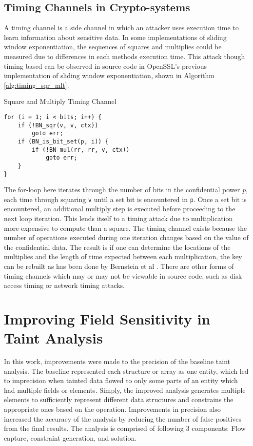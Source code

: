 \documentclass[11pt,a4paper]{article}
\begin{document}
\subsection{Timing Channels in Crypto-systems}

A timing channel is a side channel in which an attacker uses execution time to
learn information about sensitive data. In some implementations of sliding
window exponentiation, the sequences of squares and multiplies could be measured
due to differences in each methods execution time. This attack though timing
based can be observed in source code in OpenSSL's previous implementation of
sliding window exponentiation, shown in Algorithm \ref{alg:timing_sqr_mlt}. 

\begin{algorithm}
  \caption{Square and Multiply Timing Channel}
\begin{lstlisting}
for (i = 1; i < bits; i++) {
    if (!BN_sqr(v, v, ctx))
        goto err;
    if (BN_is_bit_set(p, i)) {
        if (!BN_mul(rr, rr, v, ctx))
            goto err;
    }
}
\end{lstlisting}
\label{alg:timing_sqr_mlt}
\end{algorithm}

The for-loop here iterates through the number of bits in the confidential power
\textit{p}, each time through squaring \texttt{v} until a set bit is encountered
in \texttt{p}. Once a set bit is encountered, an additional multiply step is
executed before proceeding to the next loop iteration. This lends itself to a
timing attack due to multiplication more expensive to compute than a square. The
timing channel exists because the number of operations executed during one
iteration changes based on the value of the confidential data. The result is if
one can determine the locations of the multiplies and the length of time
expected between each multiplication, the key can be rebuilt as has been done
by Bernstein et al \cite{bernstein2017sliding}. There are other forms of timing
channels which may or may not be viewable in source code, such as disk access
timing or network timing attacks. 


\section{Improving Field Sensitivity in Taint Analysis}
In this work, improvements were made to the precision of the baseline taint
analysis. The baseline represented each structure or array as one entity, which
led to imprecision when tainted data flowed to only some parts of an entity
which had multiple fields or elements. Simply, the improved analysis generates
multiple elements to sufficiently represent different data structures and
constrains the appropriate ones based on the operation. Improvements in
precision also increased the accuracy of the analysis by reducing the number of
false positives from the final results. The analysis is comprised of following 3
components: Flow capture, constraint generation, and solution.
\end{document}

